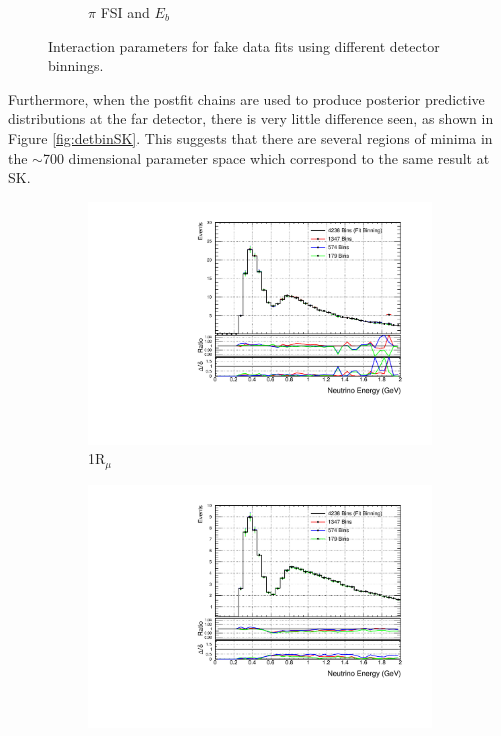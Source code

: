 \begin{figure}[!htbp]
\begin{subfigure}{0.49\textwidth}
  \caption{$\pi$ FSI and $E_b$}
\end{subfigure}
\caption{Interaction parameters for fake data fits using different detector binnings.}
\label{fig:detcovbinxsec}
\end{figure}

Furthermore, when the postfit chains are used to produce posterior predictive distributions at the far detector, there is very little difference seen, as shown in Figure \ref{fig:detbinSK}. This suggests that there are several regions of minima in the $\sim$700 dimensional parameter space which correspond to the same result at SK. 

\begin{figure}[!htbp]
\centering
\begin{subfigure}{.49\textwidth}
  \centering
  \includegraphics[width=0.95\linewidth]{figs/detbin_numu}
  \caption{1R$_{\mu}$}
\end{subfigure}
\begin{subfigure}{.49\textwidth}
  \centering
  \includegraphics[width=0.95\linewidth]{figs/detbin_numubar}

\end{subfigure}
\end{figure}
